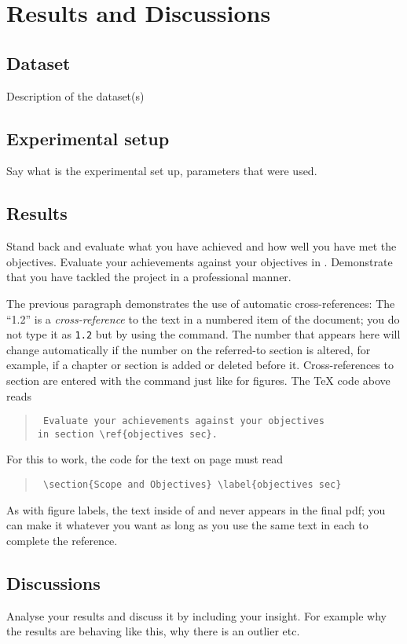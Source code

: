 \chapter{Results and Discussions}
\section{Dataset}
Description of the dataset(s)

\section{Experimental setup}
Say what is the experimental set up, parameters that were used. 

\section{Results}
Stand back and evaluate what you have achieved and how well you have met the 
objectives. Evaluate your achievements against your objectives in 
. Demonstrate that you have tackled the project in a 
professional manner. 

The previous paragraph demonstrates the use of automatic cross-references:  The 
``1.2'' is a \textit{cross-reference} to the text in a numbered item of the 
document; you do not type it as \texttt{1.2} but by using the  
command. The number that appears here will change automatically if the number 
on the referred-to section is altered, for example, if a chapter or section is 
added or deleted before it. Cross-references to section are entered with the 
 command just like for figures. The \TeX{} code above reads
\begin{quote}\tt
	Evaluate your achievements against your objectives \\[-0.5em]
	in section \textbackslash{}ref\{objectives sec\}.
\end{quote}
For this to work, the code for the text on page \pageref{objectives sec} must 
read
\begin{quote}\tt
	\textbackslash{}section\{Scope and Objectives\} 
	\textbackslash{}label\{objectives sec\}
\end{quote}
As with figure labels, the text inside of  and  never 
appears in the final pdf; you can make it whatever you want as long as you use 
the same text in each to complete the reference.

\section{Discussions}
Analyse your results and discuss it by including your insight. For example why 
the results are behaving like this, why there is an outlier etc.